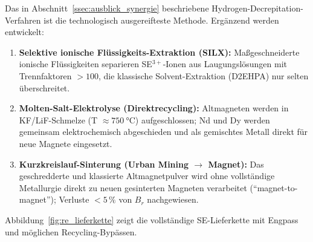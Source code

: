 ﻿\documentclass[12pt, a4paper]{report}
\theoremstyle{definition}
\theoremstyle{remark}
\begin{document}
Das in Abschnitt~\ref{ssec:ausblick_synergie} beschriebene
Hydrogen-Decrepitation-Verfahren ist die technologisch ausgereifteste
Methode. Ergänzend werden entwickelt:
\begin{enumerate}[label=\arabic*.]
  \item \textbf{Selektive ionische Flüssigkeits-Extraktion (SILX):} Maßgeschneiderte
        ionische Flüssigkeiten separieren SE$^{3+}$-Ionen aus Laugungslösungen
        mit Trennfaktoren $>100$, die klassische Solvent-Extraktion (D2EHPA)
        nur selten überschreitet.
  \item \textbf{Molten-Salt-Elektrolyse (Direktrecycling):} Altmagneten werden
        in KF/LiF-Schmelze (T $\approx\SI{750}{\celsius}$) aufgeschlossen;
        Nd und Dy werden gemeinsam elektrochemisch abgeschieden und als
        gemischtes Metall direkt für neue Magnete eingesetzt.
  \item \textbf{Kurzkreislauf-Sinterung (Urban Mining $\to$ Magnet):}
        Das geschredderte und klassierte Altmagnetpulver wird ohne
        vollständige Metallurgie direkt zu neuen gesinterten Magneten
        verarbeitet (``magnet-to-magnet''); Verluste $< 5\,\%$ von
        $B_r$ nachgewiesen.
\end{enumerate}

Abbildung~\ref{fig:re_lieferkette} zeigt die vollständige SE-Lieferkette
mit Engpass und möglichen Recycling-Bypässen.
\end{document}
